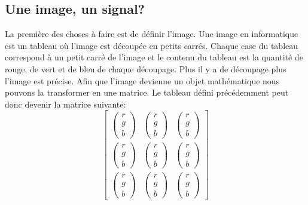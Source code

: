 \documentclass[a4paper,12pt,titlepage]{report}
\begin{document}
		\subsection{Une image, un signal?}	
		La première des choses à faire est de définir l'image. Une image en informatique est un tableau où l'image est découpée en petits carrés. Chaque case du tableau correspond à un petit carré de l'image et le contenu du tableau est la quantité de rouge, de vert et de bleu de chaque découpage. Plus il y a de découpage plus l'image est précise.
		Afin que l'image devienne un objet mathématique nous pouvons la transformer en une matrice. Le tableau défini précédemment peut donc devenir la matrice suivante:
		\begin{equation}
		\begin{bmatrix} 
		\begin{pmatrix} r \\ g\\ b \end{pmatrix} &\begin{pmatrix} r \\ g\\ b \end{pmatrix}&\begin{pmatrix} r \\ g\\ b \end{pmatrix} 
		\\ \begin{pmatrix} r \\ g\\ b \end{pmatrix} & \begin{pmatrix} r \\ g\\ b \end{pmatrix}&\begin{pmatrix} r \\ g\\ b \end{pmatrix}
		\\ \begin{pmatrix} r \\ g\\ b \end{pmatrix} & \begin{pmatrix} r \\ g\\ b \end{pmatrix}&\begin{pmatrix} r \\ g\\ b \end{pmatrix} 
		\end{bmatrix}
		\end{equation}
\end{document}
